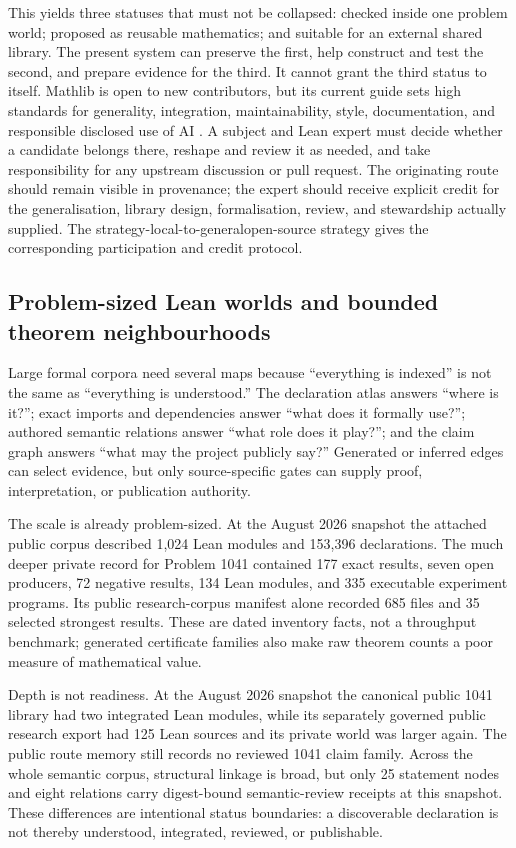 \documentclass[10pt]{article}
\begin{document}
This yields three statuses that must not be collapsed: checked inside one
problem world; proposed as reusable mathematics; and suitable for an external
shared library. The present system can preserve the first, help construct and
test the second, and prepare evidence for the third. It cannot grant the third
status to itself. Mathlib is open to new contributors, but its current guide
sets high standards for generality, integration, maintainability, style,
documentation, and responsible disclosed use of AI \cite{mathlib}. A subject
and Lean expert must decide whether a candidate belongs there, reshape and
review it as needed, and take responsibility for any upstream discussion or
pull request. The originating route should remain visible in provenance; the
expert should receive explicit credit for the generalisation, library design,
formalisation, review, and stewardship actually supplied. The
%
{strategy-local-to-general}{open-source strategy} gives the corresponding
participation and credit protocol.

\subsection{Problem-sized Lean worlds and bounded theorem neighbourhoods}

Large formal corpora need several maps because ``everything is indexed'' is
not the same as ``everything is understood.'' The declaration atlas answers
``where is it?''; exact imports and dependencies answer ``what does it formally
use?''; authored semantic relations answer ``what role does it play?''; and the
claim graph answers ``what may the project publicly say?'' Generated or inferred
edges can select evidence, but only source-specific gates can supply proof,
interpretation, or publication authority.

The scale is already problem-sized. At the August 2026 snapshot the attached
public corpus described 1,024 Lean modules and 153,396 declarations. The much
deeper private record for Problem 1041 contained 177 exact results, seven open
producers, 72 negative results, 134 Lean modules, and 335 executable experiment
programs. Its public research-corpus manifest alone recorded 685 files and 35
selected strongest results. These are dated inventory facts, not a throughput
benchmark; generated certificate families also make raw theorem counts a poor
measure of mathematical value.

Depth is not readiness. At the August 2026 snapshot the canonical public 1041
library had two integrated Lean modules, while its separately governed public
research export had 125 Lean sources and its private world was larger again. The public route
memory still records no reviewed 1041 claim family. Across the whole semantic
corpus, structural linkage is broad, but only 25 statement nodes and eight
relations carry digest-bound semantic-review receipts at this snapshot. These
differences are intentional status boundaries: a discoverable declaration is
not thereby understood, integrated, reviewed, or publishable.
\end{document}
